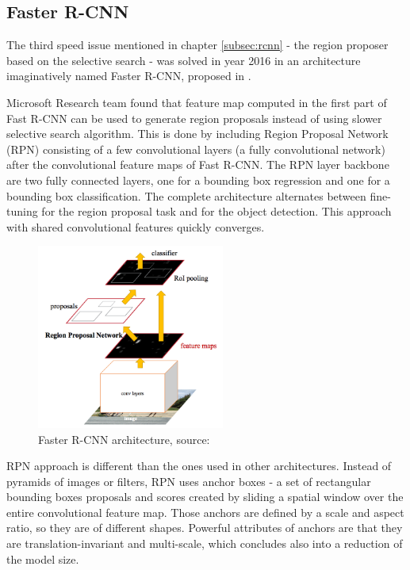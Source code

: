\documentclass[journal, onecolumn, a4paper]{IEEEtran}
\begin{document}
\subsection{Faster R-CNN}

The third speed issue mentioned in chapter \ref{subsec:rcnn} - the region proposer based on the selective search - was solved in year 2016 in an architecture imaginatively named Faster R-CNN, proposed in \cite{faster-rcnn}. 

Microsoft Research team found that feature map computed in the first part of Fast R-CNN can be used to generate region proposals instead of using slower selective search algorithm. This is done by including Region Proposal Network (RPN) consisting of a few convolutional layers (a fully convolutional network) after the convolutional feature maps of Fast R-CNN. The RPN layer backbone are two fully connected layers, one for a bounding box regression and one for a bounding box classification. The complete architecture alternates between fine-tuning for the region proposal task and for the object detection. This approach with shared convolutional features quickly converges. 

\begin{figure}[h] \centering
	\includegraphics[width=0.55\textwidth]{fasterrcnn}
	\caption{Faster R-CNN architecture, source: \cite{faster-rcnn}}
\end{figure}

RPN approach is different than the ones used in other architectures. Instead of pyramids of images or filters, RPN uses anchor boxes - a set of rectangular bounding boxes proposals and scores created by sliding a spatial window over the entire convolutional feature map. Those anchors are defined by a scale and aspect ratio, so they are of different shapes. Powerful attributes of anchors are that they are translation-invariant and multi-scale, which concludes also into a reduction of the model size. 
\end{document}
